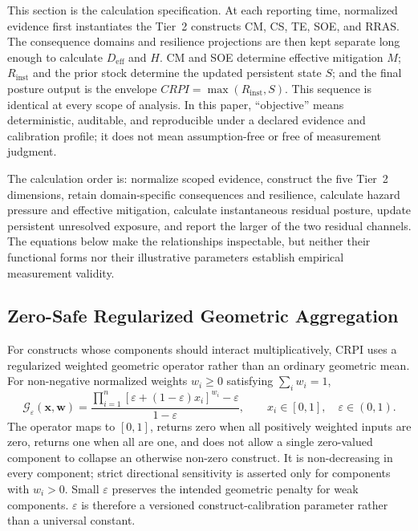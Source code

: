 \documentclass[11pt]{article}
\begin{document}
This section is the calculation specification. At each reporting time, normalized
evidence first instantiates the Tier~2 constructs CM, CS, TE, SOE, and RRAS. The
consequence domains and resilience projections are then kept separate long enough to
calculate $D_{\mathrm{eff}}$ and $H$. CM and SOE determine effective mitigation $M$;
$R_{\mathrm{inst}}$ and the prior stock determine the updated persistent state $S$;
and the final posture output is the envelope $CRPI=\max(R_{\mathrm{inst}},S)$. This
sequence is identical at every scope of analysis. In this paper, ``objective'' means
deterministic, auditable, and reproducible under a declared evidence and calibration
profile; it does not mean assumption-free or free of measurement judgment.


The calculation order is: normalize scoped evidence, construct the five
Tier~2 dimensions, retain domain-specific consequences and resilience,
calculate hazard pressure and effective mitigation, calculate instantaneous
residual posture, update persistent unresolved exposure, and report the
larger of the two residual channels. The equations below make the
relationships inspectable, but neither their functional forms nor their
illustrative parameters establish empirical measurement validity.
\subsection{Zero-Safe Regularized Geometric Aggregation}
For constructs whose components should interact multiplicatively, CRPI uses a
regularized weighted geometric operator rather than an ordinary geometric mean. For
non-negative normalized weights $w_i\geq0$ satisfying $\sum_i w_i=1$,
\begin{equation}
  \mathcal{G}_{\varepsilon}(\mathbf{x},\mathbf{w})=
  \frac{
    \displaystyle\prod_{i=1}^{n}
      \left[\varepsilon+(1-\varepsilon)x_i\right]^{w_i}
    -\varepsilon
  }{1-\varepsilon},
  \qquad x_i\in[0,1],\quad \varepsilon\in(0,1).
  \label{eq:regularized-geomean}
\end{equation}
The operator maps to $[0,1]$, returns zero when all positively weighted inputs are zero,
returns one when all are one, and does not allow a single zero-valued component to
collapse an otherwise non-zero construct. It is non-decreasing in every component;
strict directional sensitivity is asserted only for components with $w_i>0$. Small
$\varepsilon$ preserves the intended geometric penalty for weak components.
$\varepsilon$ is therefore a versioned construct-calibration parameter rather than a
universal constant.
\end{document}
